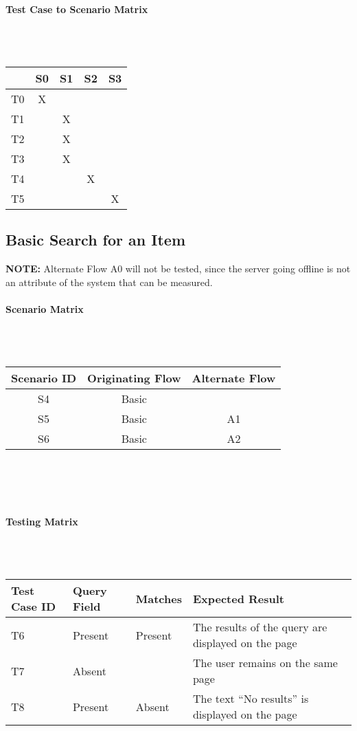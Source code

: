 \documentclass{article}
\begin{document}
\paragraph{Test Case to Scenario Matrix}~\\ \\
\begin{tabular}{ | c || c | c | c | c | }
\hline
   & S0 & S1 & S2 & S3 \\
\hline
\hline
T0 & X  &    &    &    \\
\hline
T1 &    & X  &    &    \\
\hline
T2 &    & X  &    &    \\
\hline
T3 &    & X  &    &    \\
\hline
T4 &    &    & X  &    \\
\hline
T5 &    &    &    & X  \\
\hline
\end{tabular}

\subsection{Basic Search for an Item}
\textbf{NOTE:} Alternate Flow A0 will not be tested, since the server going offline is not an attribute of the system that can be measured.

\paragraph{Scenario Matrix}~\\ \\
\begin{tabular}{ c  c  c }
\hline
Scenario ID & Originating Flow & Alternate Flow\\
\hline
\hline
S4 & Basic &  \\
\hline
S5 & Basic & A1 \\
\hline
S6 & Basic & A2 \\
\hline
\end{tabular}\\
~\\
~\\
\paragraph{Testing Matrix}~\\ \\
\begin{tabular}{ p{0.8in}  p{0.75in}  p{0.5in}  p{3in} }
\hline
Test Case ID & Query Field & Matches & Expected Result\\
\hline
\hline
T6 & Present & Present & The results of the query are displayed on the page\\
\hline
T7 & Absent & & The user remains on the same page\\
\hline
T8 & Present & Absent & The text ``No results'' is displayed on the page\\
\hline
\end{tabular}\\
~\\
~\\
\end{document}
